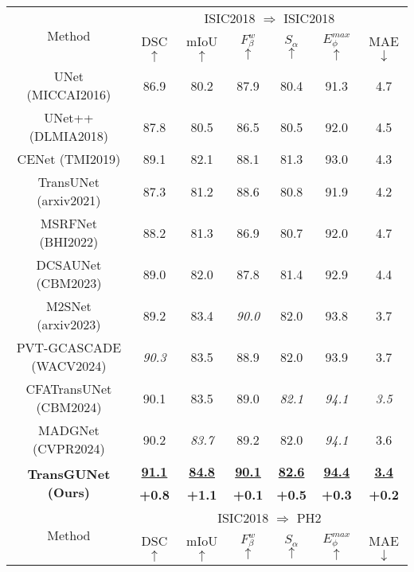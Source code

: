 \begin{table}[h]
    \centering
    \scriptsize
    \setlength\tabcolsep{2pt} %
    \renewcommand{\arraystretch}{0.9} %
    \begin{tabular}{c|cccccc}
    \hline
    \multicolumn{1}{c|}{\multirow{2}{*}{Method}} & \multicolumn{6}{c}{ISIC2018 $\Rightarrow$ ISIC2018} \\ \cline{2-7}
     & DSC \scriptsize{$\uparrow$} & mIoU \scriptsize{$\uparrow$} & $F_{\beta}^{w}$ \scriptsize{$\uparrow$}  & $S_{\alpha}$ \scriptsize{$\uparrow$} & $E_{\phi}^{max}$ \scriptsize{$\uparrow$} & MAE \scriptsize{$\downarrow$} \\
     \hline
     UNet \tiny{(MICCAI2016)}       & 86.9 & 80.2 & 87.9 & 80.4 & 91.3 & 4.7 \\
     UNet++ \tiny{(DLMIA2018)}      & 87.8 & 80.5 & 86.5 & 80.5 & 92.0 & 4.5 \\
     CENet \tiny{(TMI2019)}         & 89.1 & 82.1 & 88.1 & 81.3 & 93.0 & 4.3 \\
     TransUNet \tiny{(arxiv2021)}   & 87.3 & 81.2 & 88.6 & 80.8 & 91.9 & 4.2 \\
     MSRFNet \tiny{(BHI2022)}       & 88.2 & 81.3 & 86.9 & 80.7 & 92.0 & 4.7 \\
     DCSAUNet \tiny{(CBM2023)}      & 89.0 & 82.0 & 87.8 & 81.4 & 92.9 & 4.4 \\
     M2SNet \tiny{(arxiv2023)}      & 89.2 & 83.4 & \textit{90.0} & 82.0 & 93.8 & 3.7 \\
     PVT-GCASCADE \tiny{(WACV2024)} & \textit{90.3} & 83.5 & 88.9 & 82.0 & 93.9 & 3.7 \\
     CFATransUNet \tiny{(CBM2024)}  & 90.1 & 83.5 & 89.0 & \textit{82.1} & \textit{94.1} & \textit{3.5} \\
     MADGNet \tiny{(CVPR2024)}      & 90.2 & \textit{83.7} & 89.2 & 82.0 & \textit{94.1} & 3.6 \\
     \hline
     \multicolumn{1}{c|}{\multirow{2}{*}{\textbf{TransGUNet \tiny{(Ours)}}}}     & \textbf{\underline{91.1}} & \textbf{\underline{84.8}} & \textbf{\underline{90.1}} & \textbf{\underline{82.6}} & \textbf{\underline{94.4}} & \textbf{\underline{3.4}} \\ \cline{2-7}
     & \textbf{+0.8} & \textbf{+1.1} & \textbf{+0.1} & \textbf{+0.5} & \textbf{+0.3} & \textbf{+0.2} \\
    \hline
    \multicolumn{1}{c|}{\multirow{2}{*}{Method}} & \multicolumn{6}{c}{ISIC2018 $\Rightarrow$ PH2} \\ \cline{2-7}
     & DSC \scriptsize{$\uparrow$} & mIoU \scriptsize{$\uparrow$} & $F_{\beta}^{w}$ \scriptsize{$\uparrow$}  & $S_{\alpha}$ \scriptsize{$\uparrow$} & $E_{\phi}^{max}$ \scriptsize{$\uparrow$} & MAE \scriptsize{$\downarrow$} \\

\end{tabular}
\end{table}

